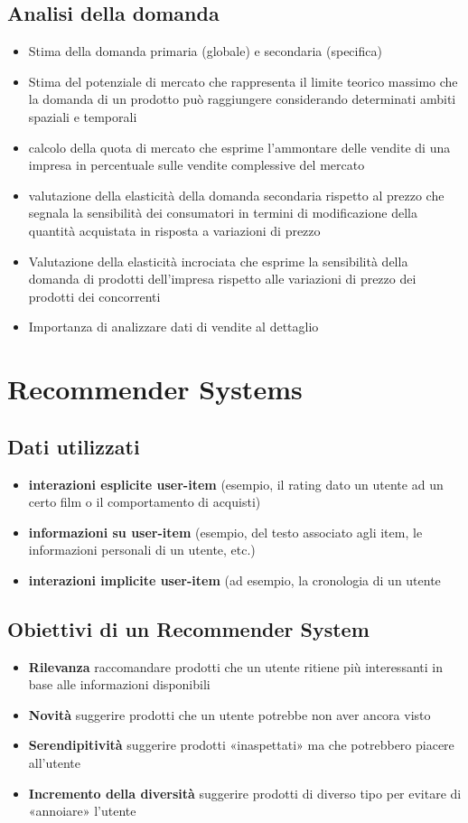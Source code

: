 \documentclass[12pt]{article}
\begin{document}
\subsection{Analisi della domanda}
\begin{itemize}
    \item Stima della domanda primaria (globale) e secondaria (specifica)
    \item Stima del potenziale di mercato che rappresenta il limite teorico massimo che la domanda di un prodotto può raggiungere considerando determinati ambiti spaziali e temporali
    \item calcolo della quota di mercato che esprime l’ammontare delle vendite di una impresa in percentuale sulle vendite complessive del mercato
    \item valutazione della elasticità della domanda secondaria rispetto al prezzo che segnala la sensibilità dei consumatori in termini di modificazione della quantità acquistata in risposta a variazioni di prezzo
    \item Valutazione della elasticità incrociata che esprime la sensibilità della domanda di prodotti dell’impresa rispetto alle variazioni di prezzo dei prodotti dei concorrenti
    \item Importanza di analizzare dati di vendite al dettaglio
\end{itemize}
\newpage
\section{Recommender Systems}
\subsection{Dati utilizzati}
\begin{itemize}
    \item \textbf{interazioni esplicite user-item} (esempio, il rating dato un utente ad un certo film o il comportamento di acquisti)
    \item \textbf{informazioni su user-item} (esempio, del testo associato agli item, le informazioni personali di un utente, etc.)
    \item \textbf{interazioni implicite user-item} (ad esempio, la cronologia di un utente
\end{itemize}
\subsection{Obiettivi di un Recommender System}
\begin{itemize}
    \item \textbf{Rilevanza} raccomandare prodotti che un utente ritiene più interessanti in base alle informazioni disponibili
    \item \textbf{Novità} suggerire prodotti che un utente potrebbe non aver ancora visto
    \item \textbf{Serendipitività} suggerire prodotti «inaspettati» ma che potrebbero piacere all’utente
    \item \textbf{Incremento della diversità} suggerire prodotti di diverso tipo per evitare di «annoiare» l’utente
\end{itemize}
\end{document}

